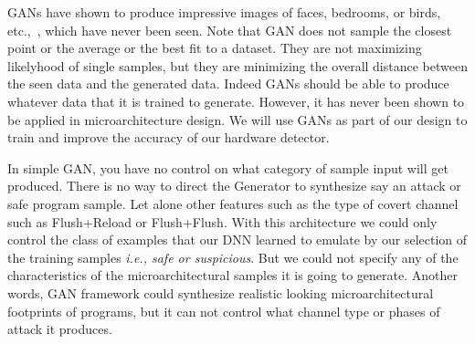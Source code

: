 
GANs have shown to produce impressive images of faces, bedrooms, or birds, etc.,~\cite{}, which have never been seen. Note that GAN does not sample the closest point or the average or the best fit to a dataset. They are not maximizing likelyhood of single samples, but they are minimizing the overall distance between the seen data and the generated data.  Indeed GANs should be able to produce whatever data that it is trained to generate. However, it has never been shown to be applied in microarchitecture design. We will use GANs as part of our design to train and improve the accuracy of our hardware detector.  


 In simple GAN, you have no control on what category of sample input will get produced. There is no way to direct the Generator to synthesize say an attack or safe program sample. Let alone other features such as the type of covert channel such as Flush+Reload or Flush+Flush.
With this architecture we could only control the class of examples that our DNN learned to emulate by our selection of the training samples {\em i.e., safe or suspicious}. But we could not specify any of the characteristics of the microarchitectural samples it is going to generate. Another words, GAN framework could synthesize realistic looking microarchitectural footprints of programs, but it can not control what channel type or phases of attack it produces.

